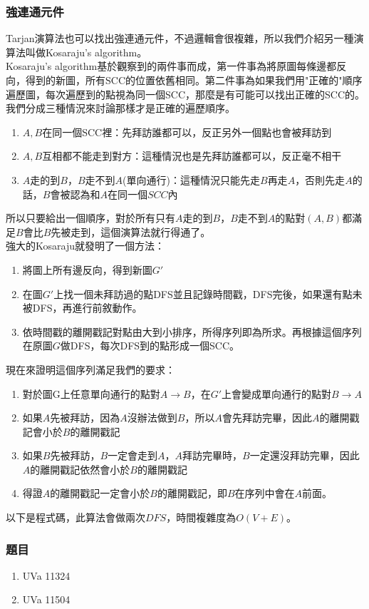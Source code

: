 \subsubsection{強連通元件}
Tarjan演算法也可以找出強連通元件，不過邏輯會很複雜，所以我們介紹另一種演算法叫做Kosaraju's algorithm。\\
Kosaraju's algorithm基於觀察到的兩件事而成，第一件事為將原圖每條邊都反向，得到的新圖，所有SCC的位置依舊相同。第二件事為如果我們用"正確的"順序遍歷圖，每次遍歷到的點視為同一個SCC，那麼是有可能可以找出正確的SCC的。\\
我們分成三種情況來討論那樣才是正確的遍歷順序。
\begin{enumerate}
\item $A,B$在同一個SCC裡：先拜訪誰都可以，反正另外一個點也會被拜訪到
\item $A,B$互相都不能走到對方：這種情況也是先拜訪誰都可以，反正毫不相干
\item $A$走的到$B$，$B$走不到$A$(單向通行)：這種情況只能先走$B$再走$A$，否則先走$A$的話，$B$會被認為和$A$在同一個$SCC$內
\end{enumerate}
所以只要給出一個順序，對於所有只有$A$走的到$B$，$B$走不到$A$的點對$(A,B)$都滿足$B$會比$B$先被走到，這個演算法就行得通了。\\
強大的Kosaraju就發明了一個方法：
\begin{enumerate}
\item 將圖上所有邊反向，得到新圖$G'$
\item 在圖$G'$上找一個未拜訪過的點DFS並且記錄時間戳，DFS完後，如果還有點未被DFS，再進行前敘動作。
\item 依時間戳的離開戳記對點由大到小排序，所得序列即為所求。再根據這個序列在原圖$G$做DFS，每次DFS到的點形成一個SCC。
\end{enumerate}
現在來證明這個序列滿足我們的要求：
\begin{enumerate}
\item 對於圖G上任意單向通行的點對$A\rightarrow B$，在$G'$上會變成單向通行的點對$B\rightarrow A$
\item 如果$A$先被拜訪，因為$A$沒辦法做到$B$，所以$A$會先拜訪完畢，因此$A$的離開戳記會小於$B$的離開戳記
\item 如果$B$先被拜訪，$B$一定會走到$A$，$A$拜訪完畢時，$B$一定還沒拜訪完畢，因此$A$的離開戳記依然會小於$B$的離開戳記
\item 得證$A$的離開戳記一定會小於$B$的離開戳記，即$B$在序列中會在$A$前面。
\end{enumerate}
以下是程式碼，此算法會做兩次$DFS$，時間複雜度為$O(V+E)$。

\subsubsection{題目}
\begin{enumerate}
\item UVa 11324
\item UVa 11504
\end{enumerate}